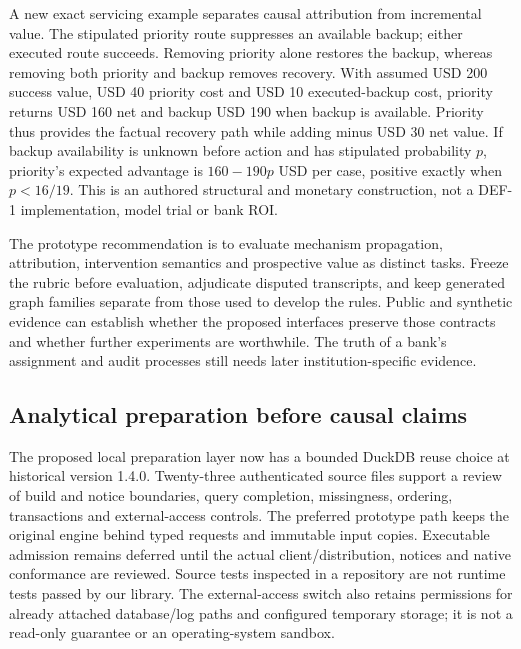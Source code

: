 A new exact servicing example separates causal attribution from
incremental value. The stipulated priority route suppresses an available
backup; either executed route succeeds. Removing priority alone restores
the backup, whereas removing both priority and backup removes recovery.
With assumed USD 200 success value, USD 40 priority cost and USD 10
executed-backup cost, priority returns USD 160 net and backup USD 190
when backup is available. Priority thus provides the factual recovery
path while adding minus USD 30 net value. If backup availability is
unknown before action and has stipulated probability \(p\), priority's
expected advantage is \(160-190p\) USD per case, positive exactly when
\(p<16/19\). This is an authored structural and monetary construction,
not a DEF-1 implementation, model trial or bank ROI.
\citep{exec18_reasoning_reference}

The prototype recommendation is to evaluate mechanism propagation,
attribution, intervention semantics and prospective value as distinct
tasks. Freeze the rubric before evaluation, adjudicate disputed
transcripts, and keep generated graph families separate from those used
to develop the rules. Public and synthetic evidence can establish
whether the proposed interfaces preserve those contracts and whether
further experiments are worthwhile. The truth of a bank's assignment and
audit processes still needs later institution-specific evidence.

\hypertarget{analytical-preparation-before-causal-claims}{%
\subsection{Analytical preparation before causal
claims}\label{analytical-preparation-before-causal-claims}}

The proposed local preparation layer now has a bounded DuckDB reuse
choice at historical version 1.4.0. Twenty-three authenticated source
files support a review of build and notice boundaries, query completion,
missingness, ordering, transactions and external-access controls. The
preferred prototype path keeps the original engine behind typed requests
and immutable input copies. Executable admission remains deferred until
the actual client/distribution, notices and native conformance are
reviewed. Source tests inspected in a repository are not runtime tests
passed by our library. The external-access switch also retains
permissions for already attached database/log paths and configured
temporary storage; it is not a read-only guarantee or an
operating-system sandbox. \citep{exec19_duckdb_source}


